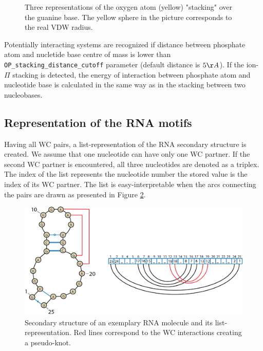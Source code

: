 \documentclass[12pt]{article}
\begin{document}
\begin{figure}[h!]
\begin{center}
{\label{stackingPiexample3}}
\caption{Three representations of the oxygen atom (yellow) "stacking" over the guanine base. The yellow sphere in the \label{stackingPiexample1} picture corresponds to the real VDW radius.}
\label{stackingPiExamples}
\end{center}
\end{figure}
Potentially interacting systems are recognized if distance between phosphate atom and nucletide base centre of mass is lower than \texttt{OP\_stacking\_distance\_cutoff} parameter (default distance is $ 5 \AA$). If the ion-$\Pi$ stacking is detected, the energy of interaction between phosphate atom and nucleotide base is calculated in the same way as in the stacking between two nucleobases. 

\subsection{Representation of the RNA motifs}
Having all WC pairs, a list-representation of the RNA secondary structure is created. We assume that one nucleotide can have only one WC partner. If the second WC partner is encountered, all three nucleotides are denoted as a triplex. The index of the list represents the nucleotide number the stored value is the index of its WC partner. The list is easy-interpretable when the arcs connecting the pairs are drawn as  presented in Figure \ref{SecondaryStructureList}. 

\begin{figure}[h!]
\centering
\includegraphics[width = \textwidth]{./pictures/PseudoKnotArchs.png}
\caption{Secondary structure of an exemplary RNA molecule and its list-representation. Red lines correspond to the WC interactions creating a pseudo-knot.}
\label{SecondaryStructureList}
\end{figure}
\end{document}
